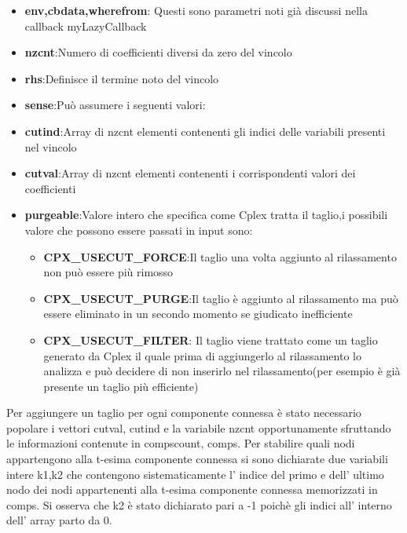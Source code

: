 \documentclass[11pt]{article}
\begin{document}
\begin{itemize}
	\item \textbf{env,cbdata,wherefrom}: Questi sono parametri noti già discussi nella callback myLazyCallback
	\item \textbf{nzcnt}:Numero di coefficienti diversi da zero del vincolo
	\item \textbf{rhs}:Definisce il termine noto del vincolo
	\item \textbf{sense}:Può assumere i seguenti valori:


	\item \textbf{cutind}:Array di  nzcnt elementi contenenti gli indici delle variabili presenti nel vincolo
	\item \textbf{cutval}:Array di  nzcnt elementi contenenti i corrispondenti valori dei coefficienti
	\item \textbf{purgeable}:Valore intero che specifica come Cplex tratta il taglio,i possibili valore che possono essere passati in input sono:
	
	\begin{itemize}
	\item \textbf{CPX\_USECUT\_FORCE}:Il taglio una volta aggiunto al rilassamento non può essere più rimosso
	\item \textbf{CPX\_USECUT\_PURGE}:Il taglio è aggiunto al rilassamento ma può essere eliminato in un secondo momento se giudicato inefficiente
	\item \textbf{CPX\_USECUT\_FILTER}: Il taglio viene trattato come un taglio generato da Cplex il quale prima di aggiungerlo al rilassamento lo analizza e può decidere di non inserirlo 
	nel rilassamento(per esempio è già presente un taglio più efficiente)
	
	\end{itemize}

    
\end{itemize}

Per aggiungere un taglio per ogni componente connessa è stato necessario popolare i vettori cutval, cutind e la variabile nzcnt opportunamente sfruttando le informazioni contenute in compscount, comps. Per stabilire quali nodi appartengono alla t-esima componente connessa si sono dichiarate due variabili intere k1,k2 che contengono sistematicamente l' indice del primo e dell' ultimo nodo dei nodi appartenenti alla t-esima componente connessa memorizzati in comps. Si osserva che k2 è stato dichiarato pari a -1 poichè gli indici all' interno dell' array parto da 0. 
\end{document}
